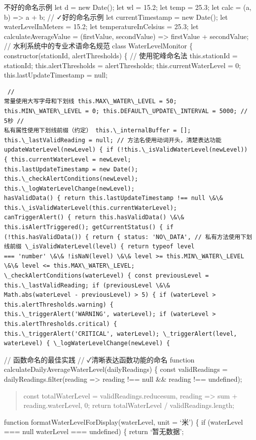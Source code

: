 {{{{{{{{\faTimes 不好的命名示例 let d = new Date(); let wl = 15.2; let temp = 25.3; let calc = (a, b) =\textgreater{} a + b; //
\faCheck 好的命名示例 let currentTimestamp = new Date(); let waterLevelInMeters = 15.2; let temperatureInCelsius = 25.3; let
calculateAverageValue = (firstValue, secondValue) =\textgreater{} firstValue + secondValue; // 水利系统中的专业术语命名规范 class
WaterLevelMonitor \{ constructor(stationId, alertThresholds) \{ // 使用驼峰命名法 this.stationId = stationId;
this.alertThresholds = alertThresholds; this.currentWaterLevel = 0; this.lastUpdateTimestamp = null; \begin{verbatim} //
常量使用大写字母和下划线 this.MAX\_WATER\_LEVEL = 50; this.MIN\_WATER\_LEVEL = 0; this.DEFAULT\_UPDATE\_INTERVAL = 5000; // 5秒 //
私有属性使用下划线前缀（约定） this.\_internalBuffer = []; this.\_lastValidReading = null; // 方法名使用动词开头，清楚表达功能
updateWaterLevel(newLevel) { if (!this.\_isValidWaterLevel(newLevel)) { this.currentWaterLevel = newLevel;
this.lastUpdateTimestamp = new Date(); this.\_checkAlertConditions(newLevel); this.\_logWaterLevelChange(newLevel);
hasValidData() { return this.lastUpdateTimestamp !== null \&\& this.\_isValidWaterLevel(this.currentWaterLevel);
canTriggerAlert() { return this.hasValidData() \&\& this.isAlertTriggered(); getCurrentStatus() { if
(!this.hasValidData()) { return { status: 'NO\_DATA', // 私有方法使用下划线前缀 \_isValidWaterLevel(level) { return typeof level
=== 'number' \&\& !isNaN(level) \&\& level >= this.MIN\_WATER\_LEVEL \&\& level <= this.MAX\_WATER\_LEVEL;
\_checkAlertConditions(waterLevel) { const previousLevel = this.\_lastValidReading; if (previousLevel \&\&
Math.abs(waterLevel - previousLevel) > 5) { if (waterLevel > this.alertThresholds.warning) {
this.\_triggerAlert('WARNING', waterLevel); if (waterLevel > this.alertThresholds.critical) {
this.\_triggerAlert('CRITICAL', waterLevel); \_triggerAlert(level, waterLevel) { \_logWaterLevelChange(newLevel) {
\end{verbatim} // 函数命名的最佳实践 // \faCheck 清晰表达函数功能的命名 function calculateDailyAverageWaterLevel(dailyReadings) \{ const
validReadings = dailyReadings.filter(reading =\textgreater{} reading !== null \&\& reading !== undefined);
\begin{quote}
 const totalWaterLevel = validReadings.reducesum, reading => sum + reading.waterLevel, 0; return
totalWaterLevel / validReadings.length; 
\end{quote} function formatWaterLevelForDisplay(waterLevel, unit = `米') \{ if
(waterLevel === null \textbar\textbar{} waterLevel === undefined) \{ return `暂无数据'; } \begin{quote}
 

\end{quote}}}}}}}}
